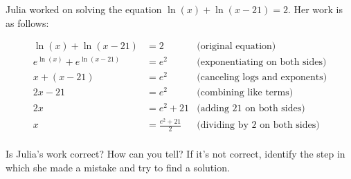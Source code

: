 \documentclass[noauthor]{ximera}
\begin{document}
\begin{problem}
Julia worked on solving the equation \(\ln(x) + \ln(x - 21) = 2\). Her
work is as follows:

\begin{align*}
\ln(x) + \ln(x - 21) & = 2 & \text{(original equation)}\\
e^{\ln(x)} + e^{\ln(x - 21)} & = e^2 & \text{(exponentiating on both sides)} \\
x + (x - 21) & = e^2 & \text{(canceling logs and exponents)}\\
2x - 21 & = e^2 & \text{(combining like terms)}\\
2x & = e^2 + 21 & \text{(adding 21 on both sides)}\\
x & = \frac{e^2 + 21}{2} & \text{(dividing by 2 on both sides)}\\
\end{align*}

Is Julia's work correct? How can you tell? If it's not correct, identify
the step in which she made a mistake and try to find a solution.
\end{problem}
\end{document}
